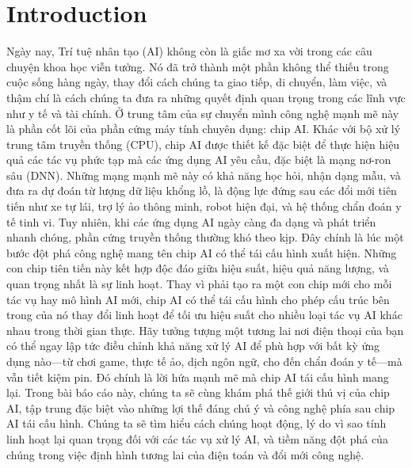 \documentclass[a4paper]{article}
\begin{document}
\section{Introduction}
Ngày nay, Trí tuệ nhân tạo (AI) không còn là giấc mơ xa vời trong các câu chuyện khoa học viễn tưởng. Nó đã trở thành một phần không thể thiếu trong cuộc sống hàng ngày, thay đổi cách chúng ta giao tiếp, di chuyển, làm việc, và thậm chí là cách chúng ta đưa ra những quyết định quan trọng trong các lĩnh vực như y tế và tài chính. Ở trung tâm của sự chuyển mình công nghệ mạnh mẽ này là phần cốt lõi của phần cứng máy tính chuyên dụng: chip AI.
Khác với bộ xử lý trung tâm truyền thống (CPU), chip AI được thiết kế đặc biệt để thực hiện hiệu quả các tác vụ phức tạp mà các ứng dụng AI yêu cầu, đặc biệt là mạng nơ-ron sâu (DNN). Những mạng mạnh mẽ này có khả năng học hỏi, nhận dạng mẫu, và đưa ra dự đoán từ lượng dữ liệu khổng lồ, là động lực đứng sau các đổi mới tiên tiến như xe tự lái, trợ lý ảo thông minh, robot hiện đại, và hệ thống chẩn đoán y tế tinh vi.
Tuy nhiên, khi các ứng dụng AI ngày càng đa dạng và phát triển nhanh chóng, phần cứng truyền thống thường khó theo kịp. Đây chính là lúc một bước đột phá công nghệ mang tên chip AI có thể tái cấu hình xuất hiện. Những con chip tiên tiến này kết hợp độc đáo giữa hiệu suất, hiệu quả năng lượng, và quan trọng nhất là sự linh hoạt. Thay vì phải tạo ra một con chip mới cho mỗi tác vụ hay mô hình AI mới, chip AI có thể tái cấu hình cho phép cấu trúc bên trong của nó thay đổi linh hoạt để tối ưu hiệu suất cho nhiều loại tác vụ AI khác nhau trong thời gian thực.
Hãy tưởng tượng một tương lai nơi điện thoại của bạn có thể ngay lập tức điều chỉnh khả năng xử lý AI để phù hợp với bất kỳ ứng dụng nào—từ chơi game, thực tế ảo, dịch ngôn ngữ, cho đến chẩn đoán y tế—mà vẫn tiết kiệm pin. Đó chính là lời hứa mạnh mẽ mà chip AI tái cấu hình mang lại.
Trong bài báo cáo này, chúng ta sẽ cùng khám phá thế giới thú vị của chip AI, tập trung đặc biệt vào những lợi thế đáng chú ý và công nghệ phía sau chip AI tái cấu hình. Chúng ta sẽ tìm hiểu cách chúng hoạt động, lý do vì sao tính linh hoạt lại quan trọng đối với các tác vụ xử lý AI, và tiềm năng đột phá của chúng trong việc định hình tương lai của điện toán và đổi mới công nghệ.
\end{document}

